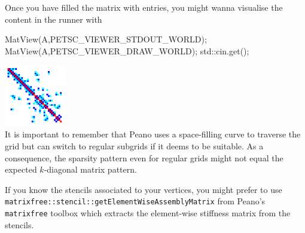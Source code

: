 \noindent
Once you have filled the matrix with entries, you might wanna visualise the
content in the runner with
\begin{code}
  MatView(A,PETSC_VIEWER_STDOUT_WORLD);
  MatView(A,PETSC_VIEWER_DRAW_WORLD);
  std::cin.get();
\end{code}

\begin{center}
  \includegraphics[width=0.2\textwidth]{43_dg/matrix-pattern.png}
  \\
  {
  \footnotesize
  It is important to remember that Peano uses a space-filling curve to traverse
  the grid but can switch to regular subgrids if it deems to be suitable. As a
  consequence, the sparsity pattern even for regular grids might not equal the
  expected $k$-diagonal matrix pattern.
  }
\end{center}

\begin{remark}
  If you know the stencils associated to your vertices, you might prefer to use
  \texttt{matrixfree::stencil::getElementWiseAssemblyMatrix} from Peano's
  \texttt{matrixfree} toolbox which extracts the element-wise stiffness matrix
  from the stencils.
\end{remark}

